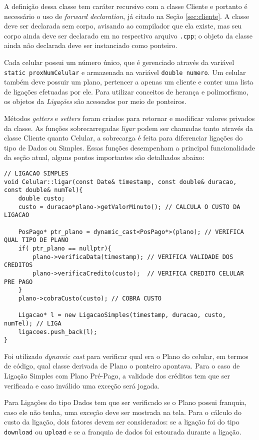 A definição dessa classe tem caráter recursivo com a classe Cliente e portanto é necessário o uso de \textit{forward declaration}, já citado na Seção \ref{sec:cliente}. A classe deve ser declarada sem corpo, avisando ao compilador que ela existe, mas seu corpo ainda deve ser declarado em no respectivo arquivo \texttt{.cpp}; o objeto da classe ainda não declarada deve ser instanciado como ponteiro.

Cada celular possui um número único, que é gerenciado através da variável \texttt{static proxNumCelular} e armazenada na variável \texttt{double numero}. Um celular também deve possuir um plano, pertencer a apenas um cliente e conter uma lista de ligações efetuadas por ele. Para utilizar conceitos de herança e polimorfismo, os objetos da \textit{Ligações} são acessados por meio de ponteiros. 

Métodos \textit{getters} e \textit{setters} foram criados para retornar e modificar valores privados da classe. As funções sobrecarregadas \textit{ligar} podem ser chamadas tanto através da classe Cliente quanto Celular, a sobrecarga é feita para diferenciar ligações do tipo de Dados ou Simples. Essas funções desempenham a principal funcionalidade da seção atual, alguns pontos importantes são detalhados abaixo:

\begin{lstlisting}
// LIGACAO SIMPLES
void Celular::ligar(const Date& timestamp, const double& duracao, const double& numTel){
	double custo;
	custo = duracao*plano->getValorMinuto(); // CALCULA O CUSTO DA LIGACAO
	
	PosPago* ptr_plano = dynamic_cast<PosPago*>(plano); // VERIFICA QUAL TIPO DE PLANO
	if( ptr_plano == nullptr){ 
		plano->verificaData(timestamp); // VERIFICA VALIDADE DOS CREDITOS
		plano->verificaCredito(custo);  // VERIFICA CREDITO CELULAR PRE PAGO
	}
	plano->cobraCusto(custo); // COBRA CUSTO
	
	Ligacao* l = new LigacaoSimples(timestamp, duracao, custo, numTel); // LIGA
	ligacoes.push_back(l);
}
\end{lstlisting}

Foi utilizado \textit{dynamic cast} para verificar qual era o Plano do celular, em termos de código, qual classe derivada de Plano o ponteiro apontava. Para o caso de Ligação Simples com Plano Pré-Pago, a validade dos créditos tem que ser verificada e caso inválido uma exceção será jogada.

Para Ligações do tipo Dados tem que ser verificado se o Plano possui franquia, caso ele não tenha, uma exceção deve ser mostrada na tela. Para o cálculo do custo da ligação, dois fatores devem ser considerados: se a ligação foi do tipo \texttt{download} ou \texttt{upload} e se a franquia de dados foi estourada durante a ligação. 

